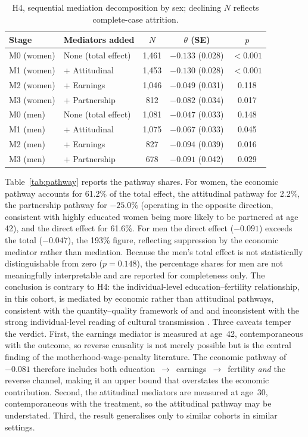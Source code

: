 \documentclass[12pt,a4paper]{report}
\begin{document}
\begin{table}[ht]
\centering
\caption{H4, sequential mediation decomposition by sex; declining $N$ reflects complete-case attrition.}
\label{tab:seq}
\small
\begin{tabular}{@{}llccc@{}}
\toprule
Stage & Mediators added & $N$ & $\theta$ (SE) & $p$ \\
\midrule
M0 (women) & None (total effect) & 1{,}461 & $-0.133$ (0.028) & $<0.001$ \\
M1 (women) & + Attitudinal & 1{,}453 & $-0.130$ (0.028) & $<0.001$ \\
M2 (women) & + Earnings & 1{,}046 & $-0.049$ (0.031) & 0.118 \\
M3 (women) & + Partnership & 812 & $-0.082$ (0.034) & 0.017 \\
M0 (men)   & None (total effect) & 1{,}081 & $-0.047$ (0.033) & 0.148 \\
M1 (men)   & + Attitudinal & 1{,}075 & $-0.067$ (0.033) & 0.045 \\
M2 (men)   & + Earnings & 827 & $-0.094$ (0.039) & 0.016 \\
M3 (men)   & + Partnership & 678 & $-0.091$ (0.042) & 0.029 \\
\bottomrule
\end{tabular}
\end{table}

Table~\ref{tab:pathway} reports the pathway shares. For women, the economic pathway accounts for
61.2\% of the total effect, the attitudinal pathway for 2.2\%, the partnership pathway for
$-25.0\%$ (operating in the opposite direction, consistent with highly educated women being more
likely to be partnered at age 42), and the direct effect for 61.6\%. For men the direct effect
($-0.091$) exceeds the total ($-0.047$), the 193\% figure, reflecting suppression by the economic
mediator rather than mediation. Because the men's total effect is not statistically distinguishable
from zero ($p=0.148$), the percentage shares for men are not meaningfully interpretable and are
reported for completeness only. The conclusion is contrary to H4: the individual-level
education--fertility relationship, in this cohort, is mediated by economic rather than
attitudinal pathways, consistent with the quantity--quality framework of \citet{becker1960}
and \citet{kaplan1996} and inconsistent with the strong individual-level reading of cultural
transmission \citep{bongaartswatkins1996,colleran2016}. Three caveats temper the verdict. First, the
earnings mediator is measured at age~42, contemporaneous with the outcome, so reverse causality is not
merely possible but is the central finding of the motherhood-wage-penalty literature. The economic
pathway of $-0.081$ therefore includes both education~$\to$~earnings~$\to$~fertility \emph{and} the
reverse channel, making it an upper bound that overstates the economic contribution. Second, the
attitudinal mediators are measured at age~30, contemporaneous with the treatment, so the
attitudinal pathway may be understated. Third, the result generalises only to
similar cohorts in similar settings.
\end{document}
